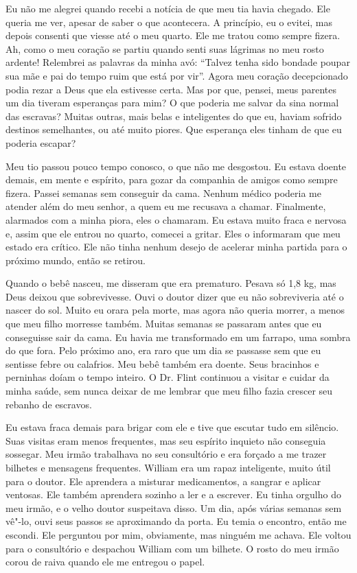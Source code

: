 Eu não me alegrei quando recebi a
notícia de que meu tia havia chegado. Ele queria me ver, apesar de saber
o que acontecera. A princípio, eu o evitei, mas depois consenti que
viesse até o meu quarto. Ele me tratou como sempre fizera. Ah, como o
meu coração se partiu quando senti suas lágrimas no meu rosto ardente!
Relembrei as palavras da minha avó: ``Talvez tenha sido bondade poupar
sua mãe e pai do tempo ruim que está por vir''. Agora meu coração
decepcionado podia rezar a Deus que ela estivesse certa. Mas por que,
pensei, meus parentes um dia tiveram esperanças para mim? O que poderia
me salvar da sina normal das escravas? Muitas outras, mais belas e
inteligentes do que eu, haviam sofrido destinos semelhantes, ou até
muito piores. Que esperança eles tinham de que eu poderia escapar?

Meu tio passou pouco tempo conosco, o
que não me desgostou. Eu estava doente demais, em mente e espírito, para
gozar da companhia de amigos como sempre fizera. Passei semanas sem
conseguir da cama. Nenhum médico poderia me atender além do meu senhor,
a quem eu me recusava a chamar. Finalmente, alarmados com a minha piora,
eles o chamaram. Eu estava muito fraca e nervosa e, assim que ele entrou
no quarto, comecei a gritar. Eles o informaram que meu estado era
crítico. Ele não tinha nenhum desejo de acelerar minha partida para o
próximo mundo, então se retirou.

Quando o bebê nasceu, me disseram que
era prematuro. Pesava só 1,8 kg, mas Deus deixou que sobrevivesse. Ouvi
o doutor dizer que eu não sobreviveria até o nascer do sol. Muito eu
orara pela morte, mas agora não queria morrer, a menos que meu filho
morresse também. Muitas semanas se passaram antes que eu conseguisse
sair da cama. Eu havia me transformado em um farrapo, uma sombra do que
fora. Pelo próximo ano, era raro que um dia se passasse sem que eu
sentisse febre ou calafrios. Meu bebê também era doente. Seus bracinhos
e perninhas doíam o tempo inteiro. O Dr. Flint continuou a visitar e
cuidar da minha saúde, sem nunca deixar de me lembrar que meu filho
fazia crescer seu rebanho de escravos.

Eu estava fraca demais para brigar com
ele e tive que escutar tudo em silêncio. Suas visitas eram menos
frequentes, mas seu espírito inquieto não conseguia sossegar. Meu irmão
trabalhava no seu consultório e era forçado a me trazer bilhetes e
mensagens frequentes. William era um rapaz inteligente, muito útil para
o doutor. Ele aprendera a misturar medicamentos, a sangrar e aplicar
ventosas. Ele também aprendera sozinho a ler e a escrever. Eu tinha
orgulho do meu irmão, e o velho doutor suspeitava disso. Um dia, após
várias semanas sem vê"-lo, ouvi seus passos se aproximando da porta. Eu
temia o encontro, então me escondi. Ele perguntou por mim, obviamente,
mas ninguém me achava. Ele voltou para o consultório e despachou William
com um bilhete. O rosto do meu irmão corou de raiva quando ele me
entregou o papel.

